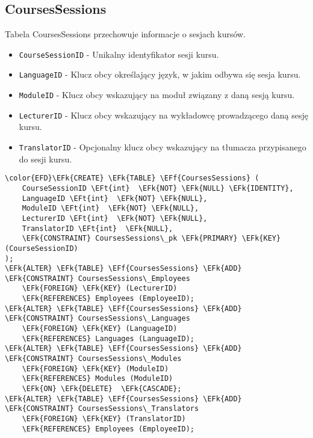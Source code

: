 \documentclass[11pt]{article}
\newcommand{\EFk}[1]{\textcolor{EFk}{\textbf{#1}}} %
\newcommand{\EFf}[1]{\textcolor{EFf}{#1}} %
\newcommand{\EFt}[1]{\textcolor{EFt}{\textbf{#1}}} %
\begin{document}
\subsection{CoursesSessions}
\label{sec:org5d24d61}
Tabela CoursesSessions przechowuje informacje o sesjach kursów.
\begin{itemize}
\item \texttt{CourseSessionID} - Unikalny identyfikator sesji kursu.
\item \texttt{LanguageID} - Klucz obcy określający język, w jakim odbywa się sesja kursu.
\item \texttt{ModuleID} - Klucz obcy wskazujący na moduł związany z daną sesją kursu.
\item \texttt{LecturerID} - Klucz obcy wskazujący na wykładowcę prowadzącego daną sesję kursu.
\item \texttt{TranslatorID} - Opcjonalny klucz obcy wskazujący na tłumacza przypisanego do sesji kursu.
\end{itemize}
\begin{Code}
\begin{Verbatim}
\color{EFD}\EFk{CREATE} \EFk{TABLE} \EFf{CoursesSessions} (
    CourseSessionID \EFt{int}  \EFk{NOT} \EFk{NULL} \EFk{IDENTITY},
    LanguageID \EFt{int}  \EFk{NOT} \EFk{NULL},
    ModuleID \EFt{int}  \EFk{NOT} \EFk{NULL},
    LecturerID \EFt{int}  \EFk{NOT} \EFk{NULL},
    TranslatorID \EFt{int}  \EFk{NULL},
    \EFk{CONSTRAINT} CoursesSessions\_pk \EFk{PRIMARY} \EFk{KEY}  (CourseSessionID)
);
\EFk{ALTER} \EFk{TABLE} \EFf{CoursesSessions} \EFk{ADD} \EFk{CONSTRAINT} CoursesSessions\_Employees
    \EFk{FOREIGN} \EFk{KEY} (LecturerID)
    \EFk{REFERENCES} Employees (EmployeeID);
\EFk{ALTER} \EFk{TABLE} \EFf{CoursesSessions} \EFk{ADD} \EFk{CONSTRAINT} CoursesSessions\_Languages
    \EFk{FOREIGN} \EFk{KEY} (LanguageID)
    \EFk{REFERENCES} Languages (LanguageID);
\EFk{ALTER} \EFk{TABLE} \EFf{CoursesSessions} \EFk{ADD} \EFk{CONSTRAINT} CoursesSessions\_Modules
    \EFk{FOREIGN} \EFk{KEY} (ModuleID)
    \EFk{REFERENCES} Modules (ModuleID)
    \EFk{ON} \EFk{DELETE}  \EFk{CASCADE};
\EFk{ALTER} \EFk{TABLE} \EFf{CoursesSessions} \EFk{ADD} \EFk{CONSTRAINT} CoursesSessions\_Translators
    \EFk{FOREIGN} \EFk{KEY} (TranslatorID)
    \EFk{REFERENCES} Employees (EmployeeID);
\end{Verbatim}
\end{Code}
\end{document}
